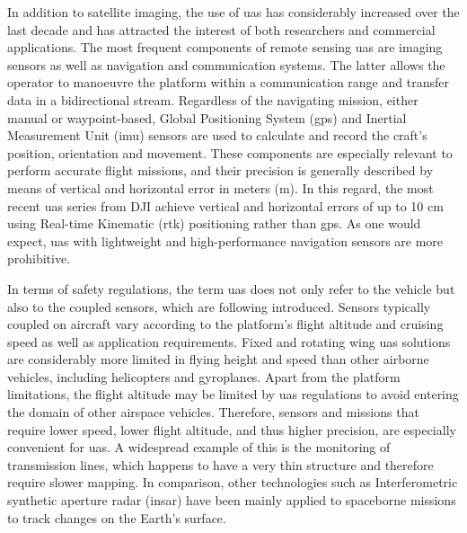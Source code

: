 In addition to satellite imaging, the use of \acrshort{uas} has considerably increased over the last decade and has attracted the interest of both researchers and commercial applications. The most frequent components of remote sensing \acrshort{uas} are imaging sensors as well as navigation and communication systems. The latter allows the operator to manoeuvre the platform within a communication range and transfer data in a bidirectional stream. Regardless of the navigating mission, either manual or waypoint-based, Global Positioning System (\acrshort{gps}) and Inertial Measurement Unit (\acrshort{imu}) sensors are used to calculate and record the craft's position, orientation and movement. These components are especially relevant to perform accurate flight missions, and their precision is generally described by means of vertical and horizontal error in meters (\si{\meter}). In this regard, the most recent \acrshort{uas} series from DJI achieve vertical and horizontal errors of up to 10 \si{\centi\meter} using Real-time Kinematic (\acrshort{rtk}) positioning rather than \acrshort{gps}. As one would expect, \acrshort{uas} with lightweight and high-performance navigation sensors are more prohibitive.    

In terms of safety regulations, the term \acrshort{uas} does not only refer to the vehicle but also to the coupled sensors, which are following introduced. Sensors typically coupled on aircraft vary according to the platform's flight altitude and cruising speed as well as application requirements. Fixed and rotating wing \acrshort{uas} solutions are considerably more limited in flying height and speed than other airborne vehicles, including helicopters and gyroplanes. Apart from the platform limitations, the flight altitude may be limited by \acrshort{uas} regulations to avoid entering the domain of other airspace vehicles. Therefore, sensors and missions that require lower speed, lower flight altitude, and thus higher precision, are especially convenient for \acrshort{uas}. A widespread example of this is the monitoring of transmission lines, which happens to have a very thin structure and therefore require slower mapping. In comparison, other technologies such as Interferometric synthetic aperture radar (\acrshort{insar}) have been mainly applied to spaceborne missions to track changes on the Earth's surface.


